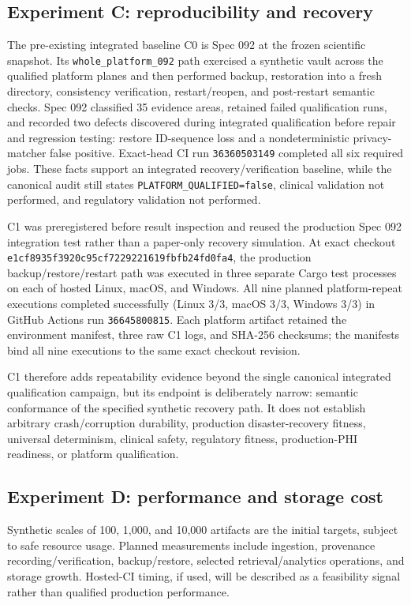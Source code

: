 \subsection{Experiment C: reproducibility and recovery}
The pre-existing integrated baseline C0 is Spec 092 at the frozen scientific snapshot. Its \texttt{whole\_platform\_092} path exercised a synthetic vault across the qualified platform planes and then performed backup, restoration into a fresh directory, consistency verification, restart/reopen, and post-restart semantic checks. Spec 092 classified 35 evidence areas, retained failed qualification runs, and recorded two defects discovered during integrated qualification before repair and regression testing: restore ID-sequence loss and a nondeterministic privacy-matcher false positive. Exact-head CI run \texttt{36360503149} completed all six required jobs. These facts support an integrated recovery/verification baseline, while the canonical audit still states \texttt{PLATFORM\_QUALIFIED=false}, clinical validation not performed, and regulatory validation not performed.

C1 was preregistered before result inspection and reused the production Spec 092 integration test rather than a paper-only recovery simulation. At exact checkout \texttt{e1cf8935f3920c95cf7229221619fbfb24fd0fa4}, the production backup/restore/restart path was executed in three separate Cargo test processes on each of hosted Linux, macOS, and Windows. All nine planned platform-repeat executions completed successfully (Linux 3/3, macOS 3/3, Windows 3/3) in GitHub Actions run \texttt{36645800815}. Each platform artifact retained the environment manifest, three raw C1 logs, and SHA-256 checksums; the manifests bind all nine executions to the same exact checkout revision.

C1 therefore adds repeatability evidence beyond the single canonical integrated qualification campaign, but its endpoint is deliberately narrow: semantic conformance of the specified synthetic recovery path. It does not establish arbitrary crash/corruption durability, production disaster-recovery fitness, universal determinism, clinical safety, regulatory fitness, production-PHI readiness, or platform qualification.

\subsection{Experiment D: performance and storage cost}
Synthetic scales of 100, 1,000, and 10,000 artifacts are the initial targets, subject to safe resource usage. Planned measurements include ingestion, provenance recording/verification, backup/restore, selected retrieval/analytics operations, and storage growth. Hosted-CI timing, if used, will be described as a feasibility signal rather than qualified production performance.

